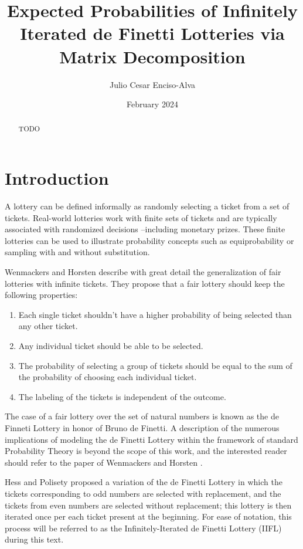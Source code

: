 \documentclass{article}
\title{Expected Probabilities of Infinitely Iterated de Finetti Lotteries via Matrix Decomposition}
\author{Julio Cesar Enciso-Alva}
\date{February 2024}
\begin{document}
\maketitle

\begin{abstract}
    TODO
\end{abstract}


\section{Introduction}

A lottery can be defined informally as randomly selecting a ticket from a set of tickets. 
%
Real-world lotteries work with finite sets of tickets and are typically associated with randomized decisions --including monetary prizes. 
%
These finite lotteries can be used to illustrate probability concepts such as equiprobability or sampling with and without substitution.

Wenmackers and Horsten \cite{fair_infinite_lottery} describe with great detail the generalization of fair lotteries with infinite tickets.
%
They propose that a fair lottery should keep the following properties:
\begin{enumerate}
    \item Each single ticket shouldn't have a higher probability of being selected than any other ticket.
    \item Any individual ticket should be able to be selected.
    \item The probability of selecting a group of tickets should be equal to the sum of the probability of choosing each individual ticket.
    \item The labeling of the tickets is independent of the outcome.
\end{enumerate}

The case of a fair lottery over the set of natural numbers is known as the de Finneti Lottery in honor of Bruno de Finetti.
%
A description of the numerous implications of modeling the de Finetti Lottery within the framework of standard Probability Theory is beyond the scope of this work, and the interested reader should refer to the paper of Wenmackers and Horsten \cite{fair_infinite_lottery}.


Hess and Polisety \cite{hess2023} proposed a variation of the de Finetti Lottery in which the tickets corresponding to odd numbers are selected with replacement, and the tickets from even numbers are selected without replacement;
this lottery is then iterated once per each ticket present at the beginning.
%
For ease of notation, this process will be referred to as the Infinitely-Iterated de Finetti Lottery (IIFL) during this text.
\end{document}
